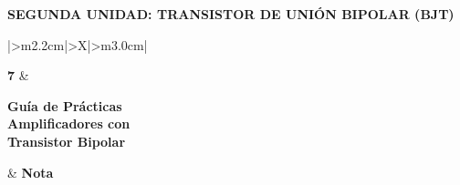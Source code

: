 \documentclass[11pt,a4paper]{article}
\let\needspace\Needspace
\begin{document}
\begin{center}
    {\normalsize\bfseries SEGUNDA UNIDAD: TRANSISTOR DE UNIÓN BIPOLAR (BJT)}
\end{center}

\vspace{0.55cm}

\begingroup
\renewcommand{\tabularxcolumn}[1]{m{#1}}
\renewcommand{\arraystretch}{2.0}
\setlength{\tabcolsep}{12pt}
\noindent
\begin{tabularx}{\textwidth}{|>{\centering\arraybackslash}m{2.2cm}|>{\centering\arraybackslash}X|>{\centering\arraybackslash}m{3.0cm}|}
\hline
\rule{0pt}{2.1cm}{\fontsize{58}{58}\selectfont\bfseries 7}
    & \begin{minipage}[c]{\linewidth}\centering
          {\large\bfseries Guía de Prácticas}\\[7pt]
          {\Large\bfseries Amplificadores con\\ Transistor Bipolar}
      \end{minipage}
    & {\Large\bfseries Nota}\\
\hline
{}\\
\hline
{}\\
\\
\hline
\end{tabularx}
\endgroup

\vspace{0.8cm}

\newcommand{\paso}[2]{%
  \par\needspace{10\baselineskip}\vspace{8pt}\noindent
  \colorbox{black!8}{\makebox[\dimexpr\linewidth-2\fboxsep\relax][l]{%
    \textbf{Paso #1 \,·\, #2}}}\par\vspace{4pt}}

\end{document}
